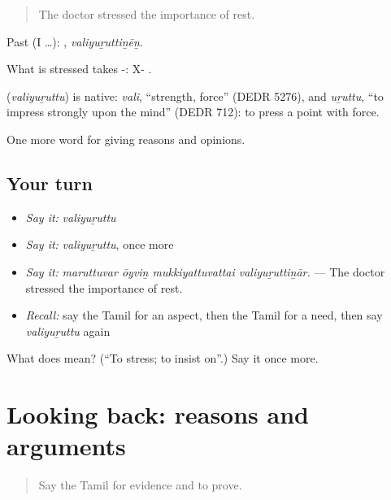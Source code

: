 \begin{quote}
The doctor stressed the importance of rest.
\end{quote}

Past (I …): , \emph{valiyuṟuttiṉēṉ}.

What is stressed takes -: X- .

\begin{cousinweb}
\textbf{} (\emph{valiyuṟuttu}) is native: \emph{vali}, \textquotedblleft{}strength, force\textquotedblright{} (DEDR 5276), and \emph{uṟuttu}, \textquotedblleft{}to impress strongly upon the mind\textquotedblright{} (DEDR 712): to press a point with force.
\end{cousinweb}

\begin{grammarlens}[title={What you've built}]
One more word for giving reasons and opinions.
\end{grammarlens}

\subsection*{Your turn}
\begin{itemize}
\raggedright
  \item \emph{Say it:} \emph{valiyuṟuttu}
  \item \emph{Say it:} \emph{valiyuṟuttu}, once more
  \item \emph{Say it:} \emph{maruttuvar ōyviṉ mukkiyattuvattai valiyuṟuttiṉār.} — The doctor stressed the importance of rest.
  \item \emph{Recall:} say the Tamil for an aspect, then the Tamil for a need, then say \emph{valiyuṟuttu} again
\end{itemize}

\begin{tcolorbox}[breakable,colback=teal!4,colframe=teal!35!black,title={Before you move on}]
What does  mean? (\textquotedblleft{}To stress; to insist on\textquotedblright{}.) Say it once more.
\end{tcolorbox}
\section[(dialogue)]{Looking back: reasons and arguments}

\label{lesson:TA-R354-review-347-354}



\begin{quote}
Say the Tamil for evidence and to prove.
\end{quote}

